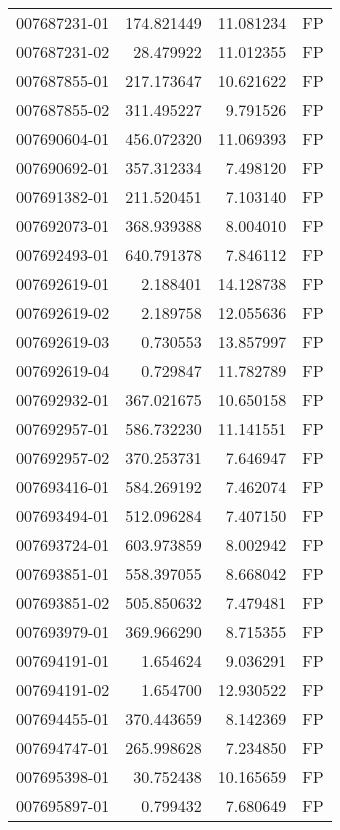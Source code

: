 \begin{tabular}{lrrl}
007687231-01 &  174.821449 &      11.081234 &   FP \\
007687231-02 &   28.479922 &      11.012355 &   FP \\
007687855-01 &  217.173647 &      10.621622 &   FP \\
007687855-02 &  311.495227 &       9.791526 &   FP \\
007690604-01 &  456.072320 &      11.069393 &   FP \\
007690692-01 &  357.312334 &       7.498120 &   FP \\
007691382-01 &  211.520451 &       7.103140 &   FP \\
007692073-01 &  368.939388 &       8.004010 &   FP \\
007692493-01 &  640.791378 &       7.846112 &   FP \\
007692619-01 &    2.188401 &      14.128738 &   FP \\
007692619-02 &    2.189758 &      12.055636 &   FP \\
007692619-03 &    0.730553 &      13.857997 &   FP \\
007692619-04 &    0.729847 &      11.782789 &   FP \\
007692932-01 &  367.021675 &      10.650158 &   FP \\
007692957-01 &  586.732230 &      11.141551 &   FP \\
007692957-02 &  370.253731 &       7.646947 &   FP \\
007693416-01 &  584.269192 &       7.462074 &   FP \\
007693494-01 &  512.096284 &       7.407150 &   FP \\
007693724-01 &  603.973859 &       8.002942 &   FP \\
007693851-01 &  558.397055 &       8.668042 &   FP \\
007693851-02 &  505.850632 &       7.479481 &   FP \\
007693979-01 &  369.966290 &       8.715355 &   FP \\
007694191-01 &    1.654624 &       9.036291 &   FP \\
007694191-02 &    1.654700 &      12.930522 &   FP \\
007694455-01 &  370.443659 &       8.142369 &   FP \\
007694747-01 &  265.998628 &       7.234850 &   FP \\
007695398-01 &   30.752438 &      10.165659 &   FP \\
007695897-01 &    0.799432 &       7.680649 &   FP \\

\end{tabular}
